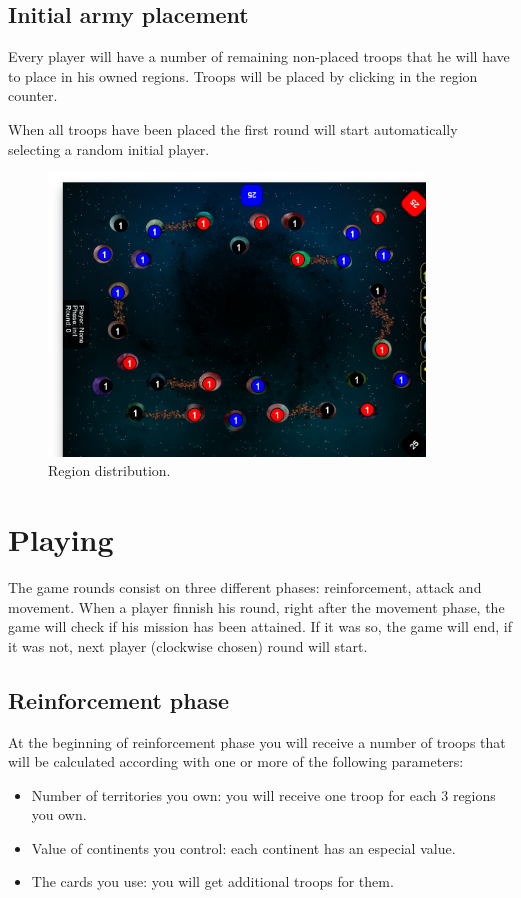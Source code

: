 \documentclass[12pt,a4paper]{article}
\begin{document}
\subsection{Initial army placement}
Every player will have a number of remaining non-placed troops that he will have to place in his owned regions. Troops will be placed by clicking in the region counter. 

When all troops have been placed the first round will start automatically selecting a random initial player.

\begin{figure}[h!]
\centering
\includegraphics[width=10cm]{pic/screenshot02.png}
\caption{Region distribution.}
\label{fig:dist}
\end{figure}

\section{Playing}
The game rounds consist on three different phases: reinforcement, attack and movement. When a player finnish his round, right after the movement phase, the game will check if his mission has been attained. If it was so, the game will end, if it was not, next player (clockwise chosen) round will start.

\subsection{Reinforcement phase}
At the beginning of reinforcement phase you will receive a number of troops that will be calculated according with one or more of the following parameters:

\begin{itemize}
\item Number of territories you own: you will receive one troop for each 3 regions you own. 
\item Value of continents you control: each continent has an especial value.
\item The cards you use: you will get additional troops for them.
\end{itemize}
\end{document}
